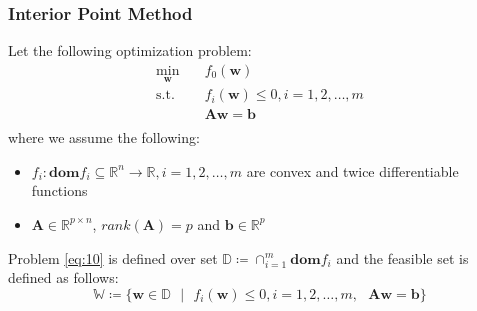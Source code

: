 \documentclass{beamer}
\begin{document}
\begin{frame}
\frametitle{\textbf{Interior Point Method}}


\justifying
Let the following optimization problem:
\begin{equation}
\begin{aligned}
\label{eq:10}
\min_{\mathbf{w}} \quad & f_{0}\left(\mathbf{w}\right)\\
\textrm{s.t.} \quad & f_{i}\left(\mathbf{w}\right) \leq 0, i = 1,2,\dots,m \\
                             & \mathbf{A}\mathbf{w} = \mathbf{b} \\
\end{aligned}
\end{equation}
where we assume the following:

\justifying
\begin{itemize}
	\item $f_{i} : \textbf{dom} f_{i} \subseteq \mathbb{R}^{n} \rightarrow \mathbb{R}, i = 1,2,\dots,m$ are convex and twice differentiable functions
	\item $\mathbf{A} \in \mathbb{R}^{p \times n}$, $rank(\mathbf{A}) = p$ and $\mathbf{b} \in \mathbb{R}^{p}$
\end{itemize}

\vspace{0.2cm}
\justifying
Problem \eqref{eq:10} is defined over set $\mathbb{D} \coloneqq \cap_{i = 1}^{m} \textbf{dom} f_{i}$ and the feasible set is defined as follows:
$$\mathbb{W} \coloneqq \{\mathbf{w} \in \mathbb{D} \textrm{ } | \textrm{ } f_{i}\left(\mathbf{w}\right) \leq 0, i =1,2,\dots,m, \textrm{ } \mathbf{A}\mathbf{w} = \mathbf{b}\}$$


\end{frame}
\end{document}
